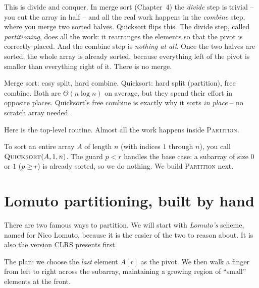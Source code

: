 This is divide and conquer. In merge sort (Chapter~4) the
\emph{divide} step is trivial -- you cut the array in half -- and all the
real work happens in the \emph{combine} step, where you merge two sorted halves.
Quicksort flips this. The divide step, called \emph{partitioning}, does all the
work: it rearranges the elements so that the pivot is correctly placed. And the
combine step is \emph{nothing at all}. Once the two halves are sorted, the whole
array is already sorted, because everything left of the pivot is smaller than
everything right of it. There is no merge.

\begin{focusbox}
Merge sort: easy split, hard combine. Quicksort: hard
split (partition), free combine. Both are $\Theta(n \log n)$ on average, but
they spend their effort in opposite places. Quicksort's free combine is exactly
why it sorts \emph{in place} -- no scratch array needed.
\end{focusbox}

Here is the top-level routine. Almost all the
work happens inside \textsc{Partition}.

\begin{algorithm}[H]
\caption{\textsc{Quicksort}($A, p, r$)}
\end{algorithm}

To sort an entire array $A$ of length $n$ (with indices $1$ through $n$), you
call $\textsc{Quicksort}(A, 1, n)$. The guard $p < r$ handles the base case:
a subarray of size $0$ or $1$ ($p \ge r$) is already sorted, so we do
nothing. We build \textsc{Partition} next.

\section{Lomuto partitioning, built by hand}

There are two famous ways to partition. We will start with \emph{Lomuto's}
scheme, named for Nico Lomuto, because it is the easier of the two to reason
about. It is also the version CLRS presents first.

The plan: we choose the \emph{last} element $A[r]$ as the pivot. We then walk a
finger from left to right across the subarray, maintaining a growing region of
``small'' elements at the front.

